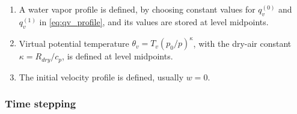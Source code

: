 \begin{enumerate}
  \item A water vapor profile is defined, by choosing constant values for $q_v^{(0)}$ and $q_v^{(1)}$ in \eqref{eq:qv_profile}, and its values are stored at level midpoints.
  \item Virtual potential temperature $\theta_v = T_v(p_0/p)^{\kappa}$, with the dry-air constant $\kappa = R_{dry}/c_p$, is defined at level midpoints.
  \item The initial velocity profile is defined, usually $w=0$.  
\end{enumerate}

\subsubsection{Time stepping}


